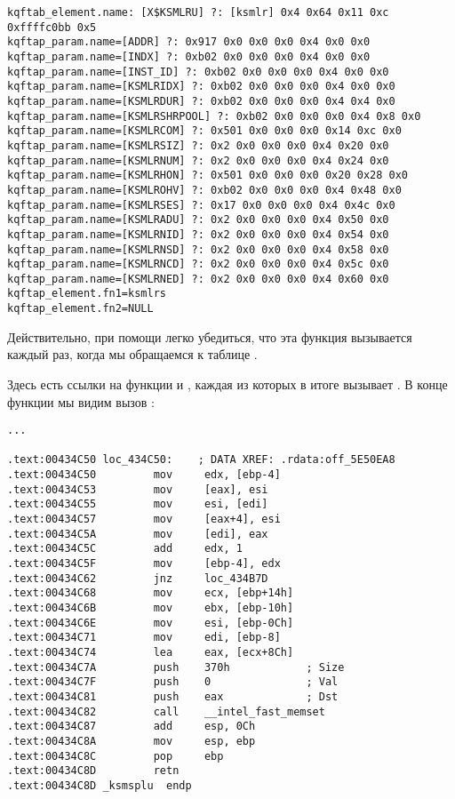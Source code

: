 \begin{lstlisting}[caption=Результат работы \OracleTablesName]
kqftab_element.name: [X$KSMLRU] ?: [ksmlr] 0x4 0x64 0x11 0xc 0xffffc0bb 0x5
kqftap_param.name=[ADDR] ?: 0x917 0x0 0x0 0x0 0x4 0x0 0x0
kqftap_param.name=[INDX] ?: 0xb02 0x0 0x0 0x0 0x4 0x0 0x0
kqftap_param.name=[INST_ID] ?: 0xb02 0x0 0x0 0x0 0x4 0x0 0x0
kqftap_param.name=[KSMLRIDX] ?: 0xb02 0x0 0x0 0x0 0x4 0x0 0x0
kqftap_param.name=[KSMLRDUR] ?: 0xb02 0x0 0x0 0x0 0x4 0x4 0x0
kqftap_param.name=[KSMLRSHRPOOL] ?: 0xb02 0x0 0x0 0x0 0x4 0x8 0x0
kqftap_param.name=[KSMLRCOM] ?: 0x501 0x0 0x0 0x0 0x14 0xc 0x0
kqftap_param.name=[KSMLRSIZ] ?: 0x2 0x0 0x0 0x0 0x4 0x20 0x0
kqftap_param.name=[KSMLRNUM] ?: 0x2 0x0 0x0 0x0 0x4 0x24 0x0
kqftap_param.name=[KSMLRHON] ?: 0x501 0x0 0x0 0x0 0x20 0x28 0x0
kqftap_param.name=[KSMLROHV] ?: 0xb02 0x0 0x0 0x0 0x4 0x48 0x0
kqftap_param.name=[KSMLRSES] ?: 0x17 0x0 0x0 0x0 0x4 0x4c 0x0
kqftap_param.name=[KSMLRADU] ?: 0x2 0x0 0x0 0x0 0x4 0x50 0x0
kqftap_param.name=[KSMLRNID] ?: 0x2 0x0 0x0 0x0 0x4 0x54 0x0
kqftap_param.name=[KSMLRNSD] ?: 0x2 0x0 0x0 0x0 0x4 0x58 0x0
kqftap_param.name=[KSMLRNCD] ?: 0x2 0x0 0x0 0x0 0x4 0x5c 0x0
kqftap_param.name=[KSMLRNED] ?: 0x2 0x0 0x0 0x0 0x4 0x60 0x0
kqftap_element.fn1=ksmlrs
kqftap_element.fn2=NULL
\end{lstlisting}

Действительно, при помощи \tracer легко убедиться, что эта функция вызывается каждый раз, когда мы обращаемся 
к таблице .

Здесь есть ссылки на функции  и , каждая из которых в итоге вызывает 
.
В конце функции  мы видим вызов :

\begin{lstlisting}[caption=ksm.o]
...

.text:00434C50 loc_434C50:    ; DATA XREF: .rdata:off_5E50EA8
.text:00434C50         mov     edx, [ebp-4]
.text:00434C53         mov     [eax], esi
.text:00434C55         mov     esi, [edi]
.text:00434C57         mov     [eax+4], esi
.text:00434C5A         mov     [edi], eax
.text:00434C5C         add     edx, 1
.text:00434C5F         mov     [ebp-4], edx
.text:00434C62         jnz     loc_434B7D
.text:00434C68         mov     ecx, [ebp+14h]
.text:00434C6B         mov     ebx, [ebp-10h]
.text:00434C6E         mov     esi, [ebp-0Ch]
.text:00434C71         mov     edi, [ebp-8]
.text:00434C74         lea     eax, [ecx+8Ch]
.text:00434C7A         push    370h            ; Size
.text:00434C7F         push    0               ; Val
.text:00434C81         push    eax             ; Dst
.text:00434C82         call    __intel_fast_memset
.text:00434C87         add     esp, 0Ch
.text:00434C8A         mov     esp, ebp
.text:00434C8C         pop     ebp
.text:00434C8D         retn
.text:00434C8D _ksmsplu  endp
\end{lstlisting}

